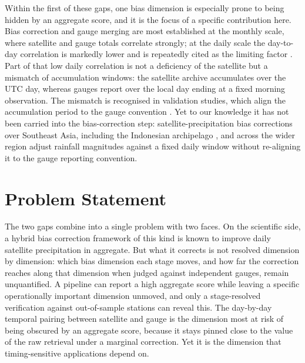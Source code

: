 Within the first of these gaps, one bias dimension is especially
prone to being hidden by an aggregate score, and it is the focus of
a specific contribution here. Bias correction and gauge merging are
most established at the monthly scale, where satellite and gauge
totals correlate strongly; at the daily scale the day-to-day
correlation is markedly lower and is repeatedly cited as the
limiting factor \citep{ref:tang2020, ref:ramadhan2022ts, ref:ramadhan2023}. Part of
that low daily correlation is not a deficiency of the satellite but
a mismatch of accumulation windows: the satellite archive
accumulates over the UTC day, whereas gauges report over the local
day ending at a fixed morning observation. The mismatch is
recognised in validation studies, which align the accumulation
period to the gauge convention \citep{ref:salio2015, ref:li2018, ref:tan2019, ref:xie2022}. Yet to our knowledge it has not been
carried into the bias-correction step: satellite-precipitation bias
corrections over Southeast Asia, including the Indonesian
archipelago \citep{ref:wang2026}, and across the wider region
\citep{ref:yang2022, ref:iqbal2022, ref:wei2022} adjust
rainfall magnitudes against a fixed daily window without re-aligning
it to the gauge reporting convention.


\section{Problem Statement}\label{sec:intro-problem}

The two gaps combine into a single problem with two faces. On
the scientific side, a hybrid bias correction framework of this
kind is known to improve daily satellite precipitation in
aggregate. But what it corrects is not resolved dimension by
dimension: which bias dimension each stage moves, and how far the
correction reaches along that dimension when judged against
independent gauges, remain unquantified. A pipeline can report a high aggregate score while
leaving a specific operationally important dimension unmoved, and
only a stage-resolved verification against out-of-sample stations
can reveal this. The day-by-day temporal pairing between
satellite and gauge is the dimension most at risk of being
obscured by an aggregate score, because it stays pinned close to
the value of the raw retrieval under a marginal correction. Yet it
is the dimension that timing-sensitive applications depend on.

